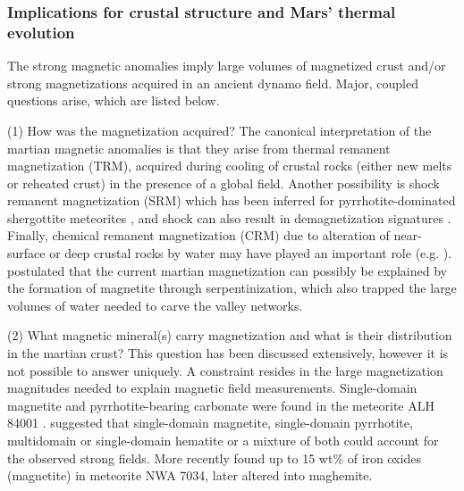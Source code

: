 \subsubsection{Implications for crustal structure and Mars’ thermal evolution}

The strong magnetic anomalies imply large volumes of magnetized crust and/or strong magnetizations \citep{Connerney1999, Purucker2000} acquired in an ancient dynamo field.  Major, coupled questions arise, which are listed below.

(1)	How was the magnetization acquired? The canonical interpretation of the martian magnetic anomalies is that they arise from thermal remanent magnetization (TRM), acquired during cooling of crustal rocks (either new melts or reheated crust) in the presence of a global field. Another possibility is shock remanent magnetization (SRM) which has been inferred for pyrrhotite-dominated shergottite meteorites \citep{Gattacceca2004}, and shock can also result in demagnetization signatures \citep{Hood2003}. Finally, chemical remanent magnetization (CRM) due to alteration of near-surface or deep crustal rocks by water may have played an important role (e.g. \citet{Harrison2002, Quesnel2009}).  \citet{Chassefiere2013} postulated that the current martian magnetization can possibly be explained by the formation of magnetite through serpentinization, which also trapped the large volumes of water needed to carve the valley networks.

(2)	What magnetic mineral(s) carry magnetization and what is their distribution in the martian crust?  This question has been discussed extensively, however it is not possible to answer uniquely.  A constraint resides in the large magnetization magnitudes needed to explain magnetic field measurements. Single-domain magnetite and pyrrhotite-bearing carbonate were found in the meteorite ALH 84001 \citep{Weiss2002, Weiss82004, Weiss2008}.  \citet{Dunlop2005} suggested that single-domain magnetite, single-domain pyrrhotite, multidomain or single-domain hematite or a mixture of both could account for the observed strong fields. More recently \citet{Gattacceca2014} found up to 15 wt\% of iron oxides (magnetite) in meteorite NWA 7034, later altered into maghemite. 

